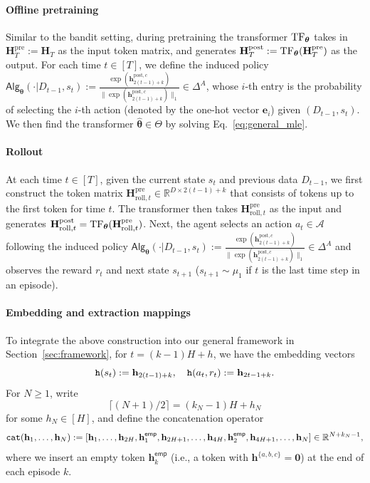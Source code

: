 \documentclass[10pt]{article}
\newcommand{\<}{\left\langle}
\renewcommand{\>}{\right\rangle}
\newcommand{\TF}{{\rm TF}}
\newcommand{\bzero}{{\mathbf 0}}
\newcommand{\R}{\mathbb{R}}
\newcommand{\pre}{{\mathrm{pre}}}
\newcommand{\post}{{\mathrm{post}}}
\newcommand{\parta}{{a}}
\newcommand{\partb}{{b}}
\newcommand{\partc}{{c}}
\newcommand{\state}{{s}}
\newcommand{\action}{{a}}
\newcommand{\reward}{{r}}
\newcommand{\totlen}{{T}}
\newcommand{\cat}{{\tt cat}}
\newcommand{\embedmap}{{\tt h}}
\newcommand{\sAlg}{{\mathsf{Alg}}}
\newcommand{\dset}{{D}}
\newcommand{\esttfpar}{{\widehat{\btheta}}}
\newcommand{\horizon}{{H}}
\newcommand{\actionsp}{{\mathcal{A}}}
\renewcommand{\horizon}{{H}}
\newcommand{\init}{{\mu_1}}
\newcommand{\tfpar}{{\btheta}}
\newcommand{\tfparspace}{{\Theta}}
\newcommand{\roll}{{\mathrm{roll}}}
\newcommand{\Numact}{{A}}
\newcommand{\emp}{{\mathsf{emp}}}
\def\bH{{\mathbf H}}
\def\btheta{{\boldsymbol \theta}}
\def\be{{\mathbf e}}
\def\bh{{\mathbf h}}
\begin{document}
\paragraph{Offline pretraining} 
Similar to the bandit setting, during
pretraining the transformer $\TF_\tfpar$ takes in   $\bH_\totlen^\pre:=\bH_\totlen$ as the input token matrix, and generates $\bH_\totlen^\post:=\TF_\tfpar(\bH_\totlen^\pre)$ as the output. For each time $t\in[\totlen]$, we define the  induced policy  $\sAlg_\tfpar(\cdot|\dset_{t-1},\state_t):=\frac{\exp(\bh^{\post,\partc}_{2(t-1)+k})}{\|\exp(\bh^{\post,\partc}_{2(t-1)+k})\|_1}\in\Delta^\Numact$, whose $i$-th entry is the probability of selecting the $i$-th action (denoted by the  one-hot vector $\be_i$) given $(\dset_{t-1},\state_t)$. We then find the transformer $\esttfpar\in\tfparspace$ by solving Eq.~\eqref{eq:general_mle}. 

\paragraph{Rollout}
At each time $t\in[\totlen]$, given the  current state $\state_t$ and  previous data $\dset_{t-1}$, we first construct the token matrix $\bH^{\pre}_{\roll,t}\in\R^{D\times 2(t-1)+k}$ that consists of tokens up to the first token for time $t$.   The transformer then takes $\bH^{\pre}_{\roll,t}$ as the input  and generates $\bH^{\post}_{\roll,t}=\TF_\tfpar(\bH^{\pre}_{\roll,t})$. Next,  the agent selects an action $\action_t\in\actionsp$ following  the induced  policy $\sAlg_\tfpar(\cdot|\dset_{t-1},\state_t):=\frac{\exp(\bh^{\post,\partc}_{2(t-1)+k})}{\|\exp(\bh^{\post,\partc}_{2(t-1)+k})\|_1}\in\Delta^\Numact$ and observes the reward $\reward_t$ and next state $\state_{t+1}$ ($\state_{t+1}\sim\init$ if $t$ is the last time step in an episode).





\paragraph{Embedding and extraction mappings}
To integrate the above construction into our general framework in Section~\ref{sec:framework}, for $t=(k-1)\horizon+h$,  we have the embedding vectors $$\embedmap(\state_t):=\bh_{2(t-1)+k},~~~\embedmap(\action_t,\reward_t):=\bh_{2t-1+k}.$$  For $N\geq 1$, write $$\lceil(N+1)/2\rceil=(k_N-1)\horizon+h_N$$ for some $h_N\in[\horizon]$, and define the  concatenation operator 
\begin{align*}
\cat(\bh_1, \ldots, \bh_N): = [\bh_1, \ldots,\bh_{2\horizon},\bh_{1}^{\emp}, \bh_{2\horizon+1},\ldots,\bh_{4\horizon},\bh_2^\emp,\bh_{4\horizon+1},\ldots, \bh_N]\in\R^{N+k_N-1},
\end{align*}
where we insert an empty token $\bh_k^\emp$ (i.e., a token with $\bh^{\{\parta,\partb,\partc\}}=\bzero$) at the end of  each episode $k$. 
\end{document}
